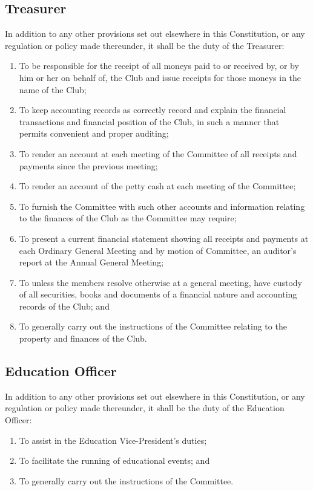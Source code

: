 \documentclass[11pt]{article} %
\begin{document}
\subsection{Treasurer}
In addition to any other provisions set out elsewhere in this Constitution, or any regulation or policy made thereunder, it shall be the duty of the Treasurer:
\begin{enumerate}
	\item To be responsible for the receipt of all moneys paid to or received by, or by him or her on behalf of, the Club and issue receipts for those moneys in the name of the Club;
	\item To keep accounting records as correctly record and explain the financial transactions and financial position of the Club, in such a manner that permits convenient and proper auditing;
	\item To render an account at each meeting of the Committee of all receipts and payments since the previous meeting;
	\item To render an account of the petty cash at each meeting of the Committee;
	\item To furnish the Committee with such other accounts and information relating to the finances of the Club as the Committee may require;
	\item To present a current financial statement showing all receipts and payments at each Ordinary General Meeting and by motion of Committee, an auditor's report at the Annual General Meeting;
	\item To unless the members resolve otherwise at a general meeting, have custody of all securities, books and documents of a financial nature and accounting records of the Club; and
	\item To generally carry out the instructions of the Committee relating to the property and finances of the Club.
\end{enumerate}

{\color{ForestGreen} \subsection{Education Officer}
In addition to any other provisions set out elsewhere in this Constitution, or any regulation or policy made thereunder, it shall be the duty of the Education Officer:
\begin{enumerate}
	\item To assist in the Education Vice-President's duties;
	\item To facilitate the running of educational events; and
	\item To generally carry out the instructions of the Committee.
\end{enumerate}}
\end{document}
